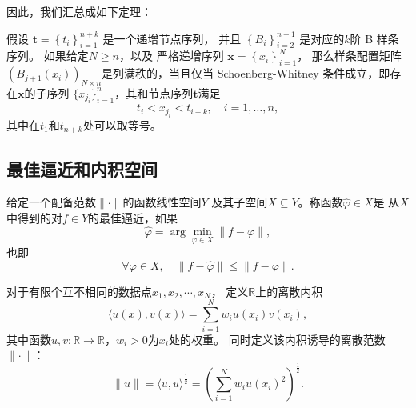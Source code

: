 因此，我们汇总成如下定理：
\begin{thm}
  \label{thm:FINALSWSplinesApproximation}
  假设 \(\mathbf{t} = \left\{t_i\right\}_{i=1}^{n+k}\) 是一个递增节点序列，
  并且 \(\left\{B_i\right\}_{i=2}^{n+1}\) 是对应的$k$阶 \textnormal{B} 样条序列。
  如果给定$N\ge n$，以及
  严格递增序列 \(\mathbf{x} = \left\{x_i\right\}_{i=1}^N\)，
  那么样条配置矩阵$(B_{j+1}(x_i))_{N\times n}$是列满秩的，当且仅当
  Schoenberg-Whitney 条件成立，即存在$\mathbf{x}$的子序列
  $\{x_{j_{i}}\}_{i=1}^{n}$，其和节点序列$\mathbf{t}$满足
  \begin{equation}
    \label{eq:FINALSWSplinesApproximation}
    t_i < x_{j_{i}} < t_{i+k}, \quad i = 1,\dots,n,
  \end{equation}
  其中在$t_{1}$和$t_{n+k}$处可以取等号。
\end{thm}


\subsection{最佳逼近和内积空间}
\label{sec:FINALBestApproximationAndLeastSquares}

\begin{defn}
  \label{def:FINALBestApproximation}
  给定一个配备范数$\|\cdot\|$的函数线性空间$Y$
  及其子空间$X \subseteq Y$。称函数$\hat{\varphi} \in X$是
  从$X$中得到的对$f\in Y$的最佳逼近，如果
  \begin{equation}
    \label{eq:FINALBestApproximation}
    \hat{\varphi} = \arg\min_{\varphi\in X}\|f-\varphi\|,   
  \end{equation}
  也即
  \begin{equation}
    \label{eq:FINALBestApproximationEquiv}
    \forall \varphi \in X, \quad
    \|f - \hat{\varphi}\| \leq \|f - \varphi\|.
  \end{equation}
\end{defn}

\begin{defn}[离散内积]
  \label{def:FINALDiscreteInnerProduct}
  对于有限个互不相同的数据点$x_{1},x_{2},\cdots,x_{N}$，
  定义$\mathbb{R}$上的离散内积
  \begin{equation}
    \label{eq:FINALDiscreteInnerProduct}
    \langle u(x),v(x)\rangle
    =\sum_{i=1}^{N}w_{i}u(x_{i})v(x_{i}),
  \end{equation}
  其中函数$u,v:\mathbb{R}\to \mathbb{R}$，$w_{i}>0$为$x_{i}$处的权重。
  同时定义该内积诱导的离散范数$\|\cdot\|$：
  \begin{equation}
    \label{eq:FINALDiscreteNorm}
    \|u\|=\langle u,u\rangle^{\frac{1}{2}}=
    \left(\sum_{i=1}^{N}w_{i}u(x_{i})^{2}\right)^{\frac{1}{2}}.
  \end{equation}
\end{defn}


